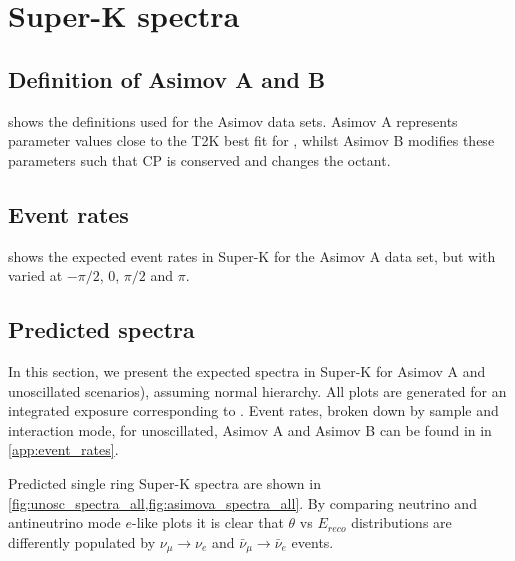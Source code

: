 \section {Super-K spectra}
\label{sec:spectra}

\subsection{Definition of Asimov A and B}
\label{sec:asimov_definition}
 shows the definitions used for the Asimov data sets. Asimov A represents parameter values close to the T2K best fit for \PrevRunPeriod, whilst Asimov B modifies these parameters such that CP is conserved and changes the \ssqthtwothree octant.


\subsection{Event rates}
\label{sec:event_rates}
 shows the expected event rates in Super-K for the Asimov A data set, but with \deltacp varied at $-\pi/2$, 0, $\pi/2$ and $\pi$.


\subsection{Predicted spectra}
\label{sec:selection:predicted_spectra}

In this section, we present the expected spectra in Super-K for Asimov A and unoscillated scenarios), assuming normal hierarchy. All plots are generated for an integrated exposure corresponding to \RunPeriod. Event rates, broken down by sample and interaction mode, for unoscillated, Asimov A and Asimov B can be found in  in \cref{app:event_rates}.

Predicted single ring Super-K spectra are shown in \cref{fig:unosc_spectra_all,fig:asimova_spectra_all}. 
By comparing neutrino and antineutrino mode $e$-like plots it is clear that $\theta$ vs $E_{reco}$ distributions are differently populated by $\nu_{\mu} \rightarrow \nu_e$ and $\bar{\nu}_{\mu} \rightarrow \bar{\nu}_e$ events.


